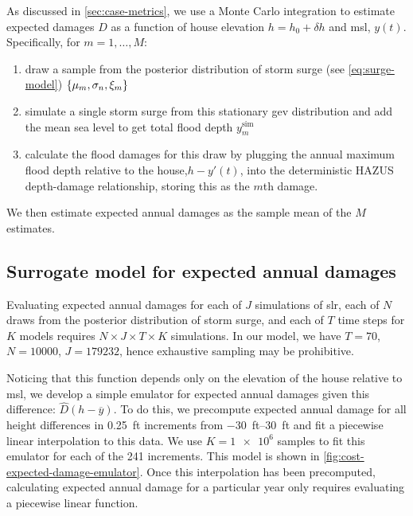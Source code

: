 \documentclass[ef,draft]{agutexSI2019}
\begin{document}
\begin{article}
    As discussed in \cref{sec:case-metrics}, we use a Monte Carlo integration to estimate expected damages $D$ as a function of house elevation $h = h_0 + \delta h$ and \gls{msl}, $y(t)$.
    Specifically, for $m=1, \ldots, M$:
    \begin{enumerate}
        \item draw a sample from the posterior distribution of storm surge (see \cref{eq:surge-model})  $\qty{ \mu_m, \sigma_n, \xi_m}$
        \item simulate a single storm surge from this stationary \gls{gev} distribution and add the mean sea level to get total flood depth $y^\mathrm{sim}_m$
        \item calculate the flood damages for this draw by plugging the annual maximum flood depth relative to the house,$h - y'(t)$, into  the deterministic HAZUS depth-damage relationship, storing this as the $m$th damage.
    \end{enumerate}
    We then estimate expected annual damages as the sample mean of the $M$ estimates.

    \subsection{Surrogate model for expected annual damages}\label{sec:surrogate-ead}
    Evaluating expected annual damages for each of $J$ simulations of \gls{slr}, each of $N$ draws from the posterior distribution of storm surge, and each of $T$ time steps for $K$ models requires $N \times J \times T \times K$ simulations.
    In our model, we have $T=70$, $N=\num{10000}$, $J=\num{179232}$, hence exhaustive sampling may be prohibitive.

    Noticing that this function depends only on the elevation of the house relative to \gls{msl}, we develop a simple emulator for expected annual damages given this difference: $\hat{D}(h - \overline{y})$.
    To do this, we  precompute expected annual damage for all height differences in \SI{0.25}{ft} increments from \SIrange{-30}{30}{ft} and fit a piecewise linear interpolation to this data.
    We use $K=\num{1e6}$ samples to fit this emulator for each of the 241 increments.
    This model is shown in \cref{fig:cost-expected-damage-emulator}.
    Once this interpolation has been precomputed, calculating expected annual damage for a particular year only requires evaluating a piecewise linear function.




\end{article}
\end{document}
